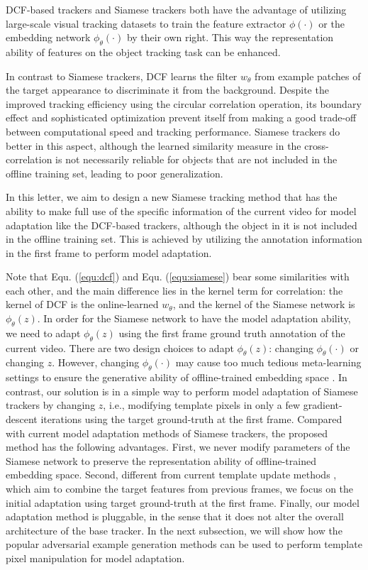 \documentclass[journal]{IEEEtran}
\begin{document}
DCF-based trackers and Siamese trackers both have the advantage of utilizing large-scale visual tracking datasets to train the feature extractor $\phi(\cdot)$ or the embedding network $\phi_{\theta}(\cdot)$ by their own right. This way the representation ability of features on the object tracking task can be enhanced. 

In contrast to Siamese trackers, DCF learns the filter $w_\theta$ from example patches of the target appearance to discriminate it from the background.
Despite the improved tracking efficiency using the circular correlation operation, its boundary effect and sophisticated optimization prevent itself from making a good trade-off between computational speed and tracking performance. Siamese trackers do better in this aspect, although the learned similarity measure in the cross-correlation is not necessarily reliable for objects that are not included in the offline training set, leading to poor generalization.

In this letter, we aim to design a new Siamese tracking method that has the ability to make full use of the specific information of the current video for model adaptation like the DCF-based trackers, although the object in it is not included in the offline training set. This is achieved by utilizing the annotation information in the first frame to perform model adaptation.

Note that Equ. (\ref{equ:dcf}) and Equ. (\ref{equ:siamese}) bear some similarities with each other, and the main difference lies in the kernel term for correlation: the kernel of DCF is the online-learned $w_{\theta}$, and the kernel of the Siamese network is $\phi_\theta(z)$. In order for the Siamese network to have the model adaptation ability, we need to adapt $\phi_\theta(z)$ using the first frame ground truth annotation of the current video. There are two design choices to adapt $\phi_\theta(z)$: changing $\phi_\theta(\cdot)$ or changing $z$. However, changing $\phi_\theta(\cdot)$ may cause too much tedious meta-learning settings to ensure the generative ability of offline-trained embedding space \cite{ROAM, DBLP:conf/aaai/JungYNCH20}. In contrast, our solution is in a simple way to perform model adaptation of Siamese trackers by changing $z$, i.e., modifying template pixels in only a few gradient-descent iterations using the target ground-truth at the first frame. Compared with current model adaptation methods of Siamese trackers, the proposed method has the following advantages. First, we never modify parameters of the Siamese network to preserve the representation ability of offline-trained embedding space. Second, different from current template update methods \cite{zhu2018distractor, Zhang_2019_ICCV}, which aim to combine the target features from previous frames, we focus on the initial adaptation using target ground-truth at the first frame. Finally, our model adaptation method is pluggable, in the sense that it does not alter the overall architecture of the base tracker. In the next subsection, we will show how the popular adversarial example generation methods can be used to perform template pixel manipulation for model adaptation.
\end{document}
